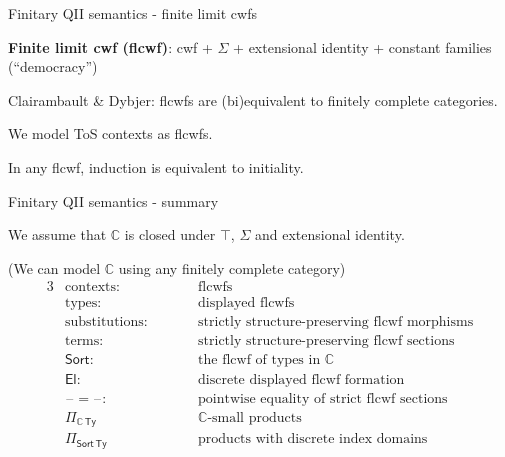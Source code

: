 \documentclass[dvipsnames]{beamer}
\newcommand{\mbb}[1]{\mathbb{#1}}
\newcommand{\Ty}{\mathsf{Ty}}
\newcommand{\El}{\mathsf{El}}
\newcommand{\blank}{\mathord{\hspace{1pt}\text{--}\hspace{1pt}}}
\newcommand{\Sort}{\mathsf{Sort}}
\newcommand{\mbbC}{\mbb{C}}
\begin{document}
\begin{frame}{Finitary QII semantics - finite limit cwfs}

\begin{definition}{}
\textbf{Finite limit cwf (flcwf)}: cwf + $\Sigma$ + extensional identity + constant families (``democracy'')
\end{definition}
\vspace{1em}

Clairambault \& Dybjer: flcwfs are (bi)equivalent to finitely complete categories.
\vspace{1em}

We model ToS contexts as flcwfs.

\begin{theorem}
In any flcwf, induction is equivalent to initiality.
\end{theorem}

\end{frame}

\begin{frame}{Finitary QII semantics - summary}

We assume that $\mbbC$ is closed under $\top$, $\Sigma$ and extensional identity.
\vspace{1em}

(We can model $\mbbC$ using any finitely complete category)
\begin{alignat*}{3}
  & \text{contexts:}                  && \text{flcwfs}\\
  & \text{types:}                     && \text{displayed flcwfs}\\
  & \text{substitutions:}\hspace{2em} && \text{strictly structure-preserving flcwf morphisms}\\
  & \text{terms:}                     && \text{strictly structure-preserving flcwf sections}\\
  & \text{$\Sort$:}                   && \text{the flcwf of types in $\mbbC$}\\
  & \text{$\El$:}                     && \text{discrete displayed flcwf formation}\\
  & \blank\!=\blank\!:                && \text{pointwise equality of strict flcwf sections}\\
  & \Pi_{\mbbC\,\Ty}                    && \text{$\mbbC$-small products}\\
  & \Pi_{\Sort\,\Ty}                    && \text{products with discrete index domains}
\end{alignat*}

\end{frame}
\end{document}

